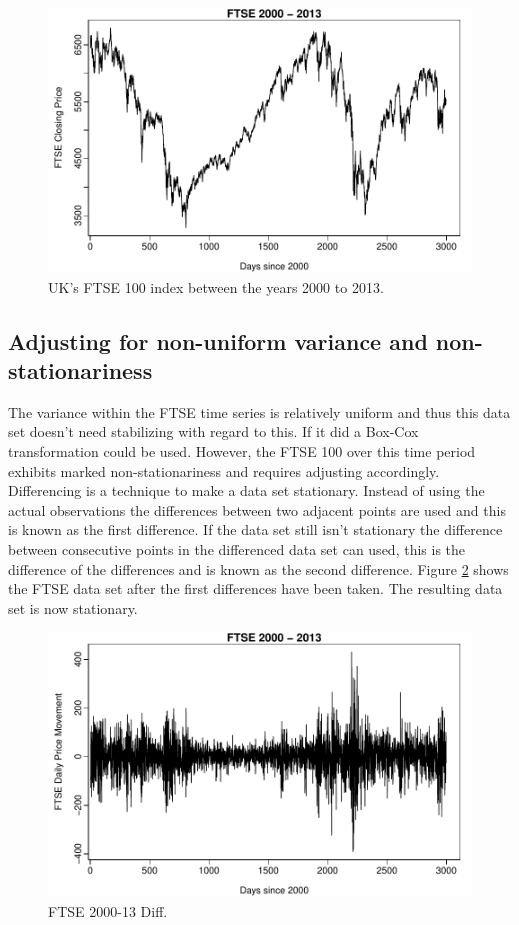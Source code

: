 \begin{figure}[tbh]
\centering
\includegraphics{Figures/chp_ts_ftse_2000-13}
\caption[FTSE 2000-13.]{UK's FTSE 100 index between the years 2000 to 2013.}
\label{fig:chp_ts_ftse_2000_13}
\end{figure}

\subsection{Adjusting for non-uniform variance and non-stationariness}
The variance within the FTSE time series is relatively uniform and thus this data set doesn't need stabilizing with regard to this. If it did a Box-Cox transformation could be used. However, the FTSE 100 over this time period exhibits marked non-stationariness and requires adjusting accordingly. Differencing is a technique to make a data set stationary. Instead of using the actual observations the differences between two adjacent points are used and this is known as the first difference. If the data set still isn't stationary the difference between consecutive points in the differenced data set can used, this is the difference of the differences and is known as the second difference. Figure \ref{fig:chp_ts_ftse_2000_13_diff} shows the FTSE data set after the first differences have been taken.  The resulting data set is now stationary.

\begin{figure}[tbh]
\centering
\includegraphics{Figures/chp_ts_ftse_2000-13_diff}
\caption[FTSE 2000-13 Diff.]{FTSE 2000-13 Diff.}
\label{fig:chp_ts_ftse_2000_13_diff}
\end{figure}

